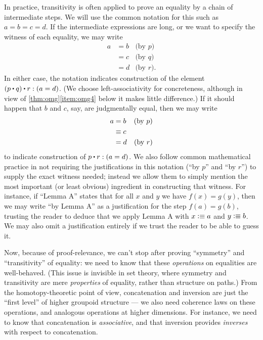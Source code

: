 In practice, transitivity is often applied to prove an equality by a chain of intermediate steps.
We will use the common notation for this such as $a=b=c=d$.
If the intermediate expressions are long, or we want to specify the witness of each equality, we may write
\begin{align*}
  a &= b & \text{(by $p$)}\\ &= c &\text{(by $q$)} \\ &= d &\text{(by $r$)}.
\end{align*}
In either case, the notation indicates construction of the element $(p\ct q)\ct r: (a=d)$.
(We choose left-associativity for concreteness, although in view of \autoref{thm:omg}\ref{item:omg4} below it makes little difference.)
If it should happen that $b$ and $c$, say, are judgmentally equal, then we may write
\begin{align*}
  a &= b & \text{(by $p$)}\\ &\equiv c \\ &= d &\text{(by $r$)}
\end{align*}
to indicate construction of $p\ct r : (a=d)$.
We also follow common mathematical practice in not requiring the justifications in this notation (``by $p$'' and ``by $r$'') to supply the exact witness needed; instead we allow them to simply mention the most important (or least obvious) ingredient in constructing that witness.
For instance, if ``Lemma A'' states that for all $x$ and $y$ we have $f(x)=g(y)$, then we may write ``by Lemma A'' as a justification for the step $f(a) = g(b)$, trusting the reader to deduce that we apply Lemma A with $x\vcentcolon\equiv a$ and $y\vcentcolon\equiv b$.
We may also omit a justification entirely if we trust the reader to be able to guess it.

Now, because of proof-relevance, we can't stop after proving ``symmetry'' and ``transitivity'' of equality: we need to know that these \emph{operations} on equalities are well-behaved.
(This issue is invisible in set theory, where symmetry and transitivity are mere \emph{properties} of equality, rather than structure on
paths.)
From the homotopy-theoretic point of view, concatenation and inversion are just the ``first level'' of higher groupoid structure --- we also need coherence laws on these operations, and analogous operations at higher dimensions.
For instance, we need to know that concatenation is \emph{associative}, and that inversion provides \emph{inverses} with respect to concatenation.

